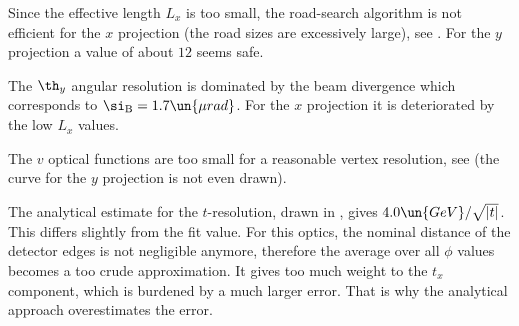 Since the effective length $L_x$ is too small, the road-search algorithm is not efficient for the $x$ projection (the road sizes are excessively large), see . For the $y$ projection a value of about $12$ seems safe.

\bmfig
{}
\emfig

The $\th_y$ angular resolution is dominated by the beam divergence which corresponds to $\si_{\rm B} = 1.7\un{\mu rad}$. For the $x$ projection it is deteriorated by the low $L_x$ values.

The $v$ optical functions are too small for a reasonable vertex resolution, see  (the curve for the $y$ projection is not even drawn).

\bmfig
{}
\emfig

The analytical estimate  for the $t$-resolution, drawn in , gives $4.0\un{GeV}/\sqrt{|t|}$. This differs slightly from the fit value. For this optics, the nominal distance of the detector edges is not negligible anymore, therefore the average over all $\phi$ values becomes a too crude approximation. It gives too much weight to the $t_x$ component, which is burdened by a much larger error. That is why the analytical approach overestimates the error.



